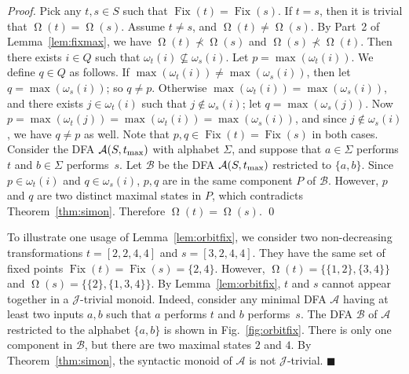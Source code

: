 \documentclass{llncs}
\newcommand{\Sig}{\Sigma}
\newcommand{\cA}{{\mathcal A}}
\newcommand{\cB}{{\mathcal B}}
\newcommand{\gJ}{{\mathcal J}}
\newcommand{\qedb}{\hfill$\blacksquare$}
\DeclareMathOperator{\Fix}{Fix}
\DeclareMathOperator{\Orbit}{\Omega}
\begin{document}
\begin{proof}
Pick any $t, s \in S$ such that $\Fix(t) = \Fix(s)$. If $t = s$, then it is trivial that $\Orbit(t) = \Orbit(s)$. Assume $t \neq s$, and $\Orbit(t) \neq \Orbit(s)$. By Part~2 of Lemma~\ref{lem:fixmax}, we have $\Orbit(t) \not\prec \Orbit(s)$ and $\Orbit(s) \not\prec \Orbit(t)$. Then there exists $i \in Q$ such that $\omega_t(i) \not\subseteq \omega_s(i)$. Let $p = \max(\omega_t(i))$. We define $q \in Q$ as follows. If $\max(\omega_t(i)) \neq \max(\omega_s(i))$, then let $q = \max(\omega_s(i))$; so $q \neq p$. Otherwise $\max(\omega_t(i)) = \max(\omega_s(i))$, and there exists $j \in \omega_t(i)$ such that $j \not\in \omega_s(i)$; let $q = \max(\omega_s(j))$. Now $p = \max(\omega_t(j)) = \max(\omega_t(i)) = \max(\omega_s(i))$, and since $j \not\in \omega_s(i)$, we have $q \neq p$ as well. Note that $p,q \in \Fix(t) = \Fix(s)$ in both cases. Consider the DFA $\cA(S, \trmax)$ with alphabet $\Sig$, and suppose that $a \in \Sig$ performs $t$ and $b \in \Sig$ performs~$s$. Let $\cB$ be the DFA $\cA(S, \trmax)$ restricted to $\{a,b\}$. Since $p \in \omega_t(i)$ and $q \in \omega_s(i)$, $p, q$ are in the same component $P$ of $\cB$. However, $p$ and $q$ are two distinct maximal states in $P$, which contradicts Theorem~\ref{thm:simon}. Therefore $\Orbit(t) = \Orbit(s)$. \qed
\end{proof}



\begin{example}\label{ex:orbitfix}
To illustrate one usage of Lemma~\ref{lem:orbitfix}, we consider two non-decreasing transformations $t = [2,2,4,4]$ and $s = [3,2,4,4]$. They have the same set of fixed points $\Fix(t) = \Fix(s) = \{2,4\}$. However, $\Orbit(t) = \{\{1,2\}, \{3,4\}\}$ and $\Orbit(s) = \{\{2\}, \{1,3,4\}\}$. By Lemma~\ref{lem:orbitfix}, $t$ and $s$ cannot appear together in a $\gJ$-trivial monoid. Indeed, consider any minimal DFA $\cA$ having at least two inputs $a,b$ such that $a$ performs $t$ and $b$ performs~$s$. The DFA $\cB$ of $\cA$ restricted to the alphabet $\{a,b\}$ is shown in Fig.~\ref{fig:orbitfix}. There is only one component in $\cB$, but there are two maximal states $2$ and $4$. By Theorem~\ref{thm:simon}, the syntactic monoid of $\cA$ is not $\gJ$-trivial. \qedb
\end{example}
\end{document}
